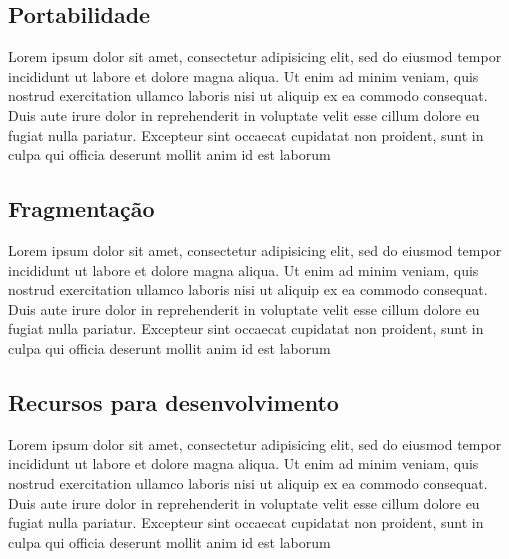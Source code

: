 \subsection{Portabilidade}

Lorem ipsum dolor sit amet, consectetur adipisicing elit, sed do eiusmod tempor incididunt ut labore et dolore magna aliqua. Ut enim ad minim veniam, quis nostrud exercitation ullamco laboris nisi ut aliquip ex ea commodo consequat. Duis aute irure dolor in reprehenderit in voluptate velit esse cillum dolore eu fugiat nulla pariatur.  Excepteur sint occaecat cupidatat non proident, sunt in culpa qui officia deserunt mollit anim id est laborum

\subsection{Fragmentação}

Lorem ipsum dolor sit amet, consectetur adipisicing elit, sed do eiusmod tempor incididunt ut labore et dolore magna aliqua. Ut enim ad minim veniam, quis nostrud exercitation ullamco laboris nisi ut aliquip ex ea commodo consequat. Duis aute irure dolor in reprehenderit in voluptate velit esse cillum dolore eu fugiat nulla pariatur.  Excepteur sint occaecat cupidatat non proident, sunt in culpa qui officia deserunt mollit anim id est laborum

\subsection{Recursos para desenvolvimento}

Lorem ipsum dolor sit amet, consectetur adipisicing elit, sed do eiusmod tempor incididunt ut labore et dolore magna aliqua. Ut enim ad minim veniam, quis nostrud exercitation ullamco laboris nisi ut aliquip ex ea commodo consequat. Duis aute irure dolor in reprehenderit in voluptate velit esse cillum dolore eu fugiat nulla pariatur.  Excepteur sint occaecat cupidatat non proident, sunt in culpa qui officia deserunt mollit anim id est laborum
